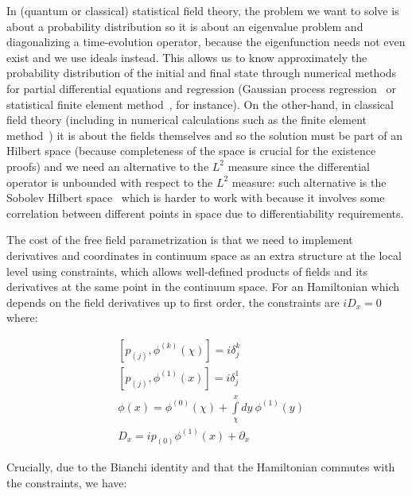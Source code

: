 \documentclass[11pt]{book}
\begin{document}
In (quantum or classical) statistical field theory, the problem we want
to solve is about a probability distribution so it is about an
eigenvalue problem and diagonalizing a time-evolution operator, because
the eigenfunction needs not even exist and we use ideals instead. This
allows us to know approximately the probability distribution of the
initial and final state through numerical methods for partial
differential equations and regression (Gaussian process
regression~\cite{Rasmussen2006Gaussian} or statistical finite element
method~\cite{Dar2002Statistical}, for instance). On the other-hand, in classical field
theory (including in numerical calculations such as the finite element
method~\cite{Davidsson2018Sobolev}\cite{2012Automated}) it is about the fields themselves and so the solution must be
part of an Hilbert space (because completeness of the space is crucial
for the existence proofs) and we need an alternative to the \(L^2\)
measure since the differential operator is unbounded with respect to the
\(L^2\) measure: such alternative is the Sobolev Hilbert
space~\cite{Leoni2009first} which is
harder to work with because it involves some correlation between
different points in space due to differentiability
requirements\cite{Ringstruxf6m2009cauchy}\cite{Kijowski1973finite}.

The cost of the free field parametrization is that we need to implement
derivatives and coordinates in continuum space as an extra structure at
the local level using constraints, which allows well-defined products of
fields and its derivatives at the same point in the continuum space. For
an Hamiltonian which depends on the field derivatives up to first order,
the constraints are \(iD_x=0\) where:

\begin{equation}\begin{aligned}
    &[p_{(j)},\phi^{(k)}(\chi)]=i\delta_j^k\\
    &[p_{(j)},\phi^{(1)}(x)]=i\delta_j^1\\
    &\phi(x)=\phi^{(0)}(\chi)+\int\limits_{\chi}^x dy\ \phi^{(1)}(y)\\
    &D_x=ip_{(0)}\phi^{(1)}(x)+\partial_x
\end{aligned}\end{equation}

Crucially, due to the Bianchi identity and that the Hamiltonian commutes
with the constraints, we have:
\end{document}
